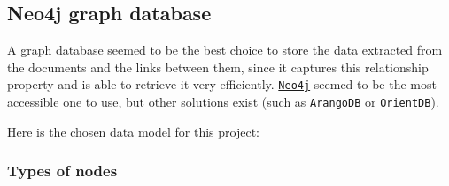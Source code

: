 
\subsection{Neo4j graph database} \label{ssec:neo4j-graph-database}

A graph database seemed to be the best choice to store the data extracted from the documents and the links between them, since it captures this relationship property and is able to retrieve it very efficiently. \href{https://neo4j.com/}{\texttt{Neo4j}} seemed to be the most accessible one to use, but other solutions exist (such as \href{https://www.arangodb.com/}{\texttt{ArangoDB}} or \href{https://orientdb.org/}{\texttt{OrientDB}}).

Here is the chosen data model for this project:

\subsubsection{Types of nodes} \label{sssec:types-of-nodes}

